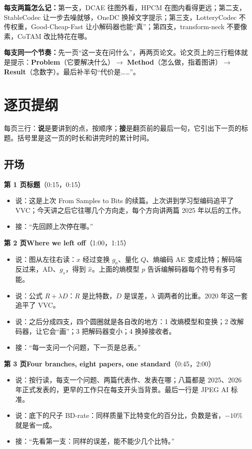 \textbf{每支两篇怎么记：}第一支，DCAE 往图外看，HPCM 在图内看得更远；第二支，StableCodec 让一步去噪就够，OneDC 换掉文字提示；第三支，LotteryCodec 不传权重，Good-Cheap-Fast 让小解码器也能“真”；第四支，transform-neck 不要像素，CoTAM 改比特花在哪。

\textbf{每支同一个节奏：}先一页“这一支在问什么”，再两页论文。论文页上的三行粗体就是提示：\textbf{Problem}（它要解决什么）$\to$ \textbf{Method}（怎么做，指着图讲）$\to$ \textbf{Result}（念数字）。最后补半句“代价是……”。

\section{逐页提纲}\label{sec:pages}

每页三行：\textbf{说}是要讲到的点，按顺序；\textbf{接}是翻页前的最后一句，它引出下一页的标题。括号里是这一页的时长和讲完时的累计时间。

\subsection*{开场}

\textbf{第 1 页\quad 标题}（0:15，0:15）
\begin{itemize}
  \item 说：这是上次 From Samples to Bits 的续篇。上次讲到学习型编码追平了 VVC；今天讲之后它往哪几个方向走，每个方向讲两篇 2025 年以后的工作。
  \item 接：“先回顾上次停在哪。”
\end{itemize}

\textbf{第 2 页\quad Where we left off}（1:00，1:15）
\begin{itemize}
  \item 说：图从左往右读：$x$ 经过变换 $g_a$、量化 $Q$、熵编码 AE 变成比特；解码端反过来，AD、$g_s$，得到 $\hat x$。上面的熵模型 $p$ 告诉编解码器每个符号有多可能。
  \item 说：公式 $R+\lambda D$：$R$ 是比特数，$D$ 是误差，$\lambda$ 调两者的比重。2020 年这一套追平了 VVC。
  \item 说：之后分成四支，四个圆圈就是各自改的地方：1 改熵模型和变换；2 改解码器，让它会“画”；3 把解码器变小；4 换掉接收者。
  \item 接：“每一支问一个问题，下一页是总表。”
\end{itemize}

\textbf{第 3 页\quad Four branches, eight papers, one standard}（0:45，2:00）
\begin{itemize}
  \item 说：按行读，每支一个问题、两篇代表作、发表在哪；八篇都是 2025、2026 年正式发表的，更早的工作只在每支开头当背景。最后一行是 JPEG AI 标准。
  \item 说：底下的尺子 BD-rate：同样质量下比特变化的百分比，负数是省，$-10\%$ 就是省一成。
  \item 接：“先看第一支：同样的误差，能不能少几个比特。”
\end{itemize}

